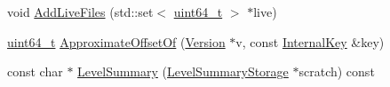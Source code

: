 \begin{DoxyCompactItemize}
void \hyperlink{classleveldb_1_1_version_set_a3b3c810f0fea88db81b94e604b3dd78f}{Add\-Live\-Files} (std\-::set$<$ \hyperlink{stdint_8h_aaa5d1cd013383c889537491c3cfd9aad}{uint64\-\_\-t} $>$ $\ast$live)
\item 
\hyperlink{stdint_8h_aaa5d1cd013383c889537491c3cfd9aad}{uint64\-\_\-t} \hyperlink{classleveldb_1_1_version_set_ada7f3ed63b1c48adb6e5b38348b300e1}{Approximate\-Offset\-Of} (\hyperlink{classleveldb_1_1_version}{Version} $\ast$v, const \hyperlink{classleveldb_1_1_internal_key}{Internal\-Key} \&key)
\item 
const char $\ast$ \hyperlink{classleveldb_1_1_version_set_abc156e2c0a7f2d0ef4a14b6f27a382a3}{Level\-Summary} (\hyperlink{structleveldb_1_1_version_set_1_1_level_summary_storage}{Level\-Summary\-Storage} $\ast$scratch) const 
\end{DoxyCompactItemize}

